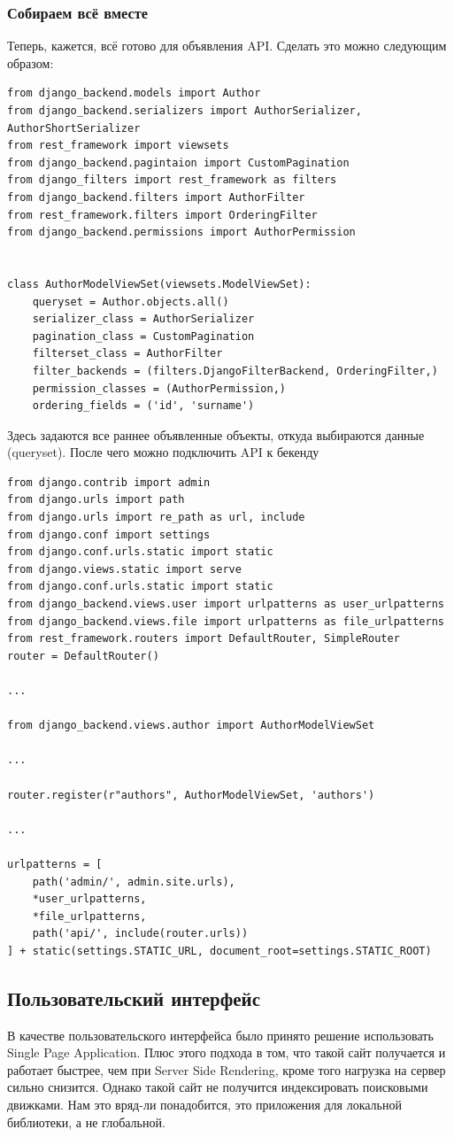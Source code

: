 \documentclass[a4paper,14pt]{extarticle}
\begin{document}
\subsubsection{Собираем всё вместе}
Теперь, кажется, всё готово для объявления API. Сделать это можно следующим образом:
\begin{verbatim}
from django_backend.models import Author
from django_backend.serializers import AuthorSerializer, AuthorShortSerializer
from rest_framework import viewsets
from django_backend.pagintaion import CustomPagination
from django_filters import rest_framework as filters
from django_backend.filters import AuthorFilter
from rest_framework.filters import OrderingFilter
from django_backend.permissions import AuthorPermission


class AuthorModelViewSet(viewsets.ModelViewSet):
    queryset = Author.objects.all()
    serializer_class = AuthorSerializer
    pagination_class = CustomPagination
    filterset_class = AuthorFilter
    filter_backends = (filters.DjangoFilterBackend, OrderingFilter,)
    permission_classes = (AuthorPermission,)
    ordering_fields = ('id', 'surname')
\end{verbatim}
Здесь задаются все раннее объявленные объекты, откуда выбираются данные (queryset). После чего
можно подключить API к бекенду
\begin{verbatim}
from django.contrib import admin
from django.urls import path
from django.urls import re_path as url, include
from django.conf import settings
from django.conf.urls.static import static
from django.views.static import serve
from django.conf.urls.static import static
from django_backend.views.user import urlpatterns as user_urlpatterns
from django_backend.views.file import urlpatterns as file_urlpatterns
from rest_framework.routers import DefaultRouter, SimpleRouter
router = DefaultRouter()

...

from django_backend.views.author import AuthorModelViewSet

...

router.register(r"authors", AuthorModelViewSet, 'authors')

...

urlpatterns = [
    path('admin/', admin.site.urls),
    *user_urlpatterns,
    *file_urlpatterns,
    path('api/', include(router.urls))
] + static(settings.STATIC_URL, document_root=settings.STATIC_ROOT)
\end{verbatim}

\subsection{Пользовательский интерфейс}
В качестве пользовательского интерфейса было принято решение использовать Single 
Page Application. Плюс этого подхода в том, что такой сайт получается и работает 
быстрее, чем при Server Side Rendering, кроме того нагрузка на сервер сильно снизится. 
Однако такой сайт не получится индексировать поисковыми движками. Нам это вряд-ли понадобится, 
это приложения для локальной библиотеки, а не глобальной.
\end{document}
